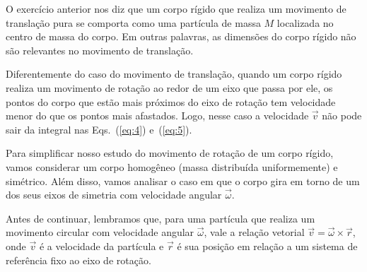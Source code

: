 \documentclass[papersize=a4,DIV=calc,twocolumn=on]{scrartcl}
\theoremstyle{definition}
\begin{document}
O exercício anterior nos diz que um corpo rígido que realiza um
movimento de translação pura se comporta como uma partícula de massa
$M$ localizada no centro de massa do corpo. Em outras palavras, as
dimensões do corpo rígido não são relevantes no movimento de
translação.

Diferentemente do caso do movimento de trans\-la\-ção, quando um corpo
rígido realiza um movimento de rotação ao redor de um eixo que passa
por ele, os pontos do corpo que estão mais próximos do eixo de rotação
tem velocidade menor do que os pontos mais afastados. Logo, nesse caso
a velocidade $\vec v$ não pode sair da integral nas Eqs.~(\ref{eq:4})
e~(\ref{eq:5}).

Para simplificar nosso estudo do movimento de rotação de um corpo
rígido, vamos considerar um corpo homogêneo (massa distribuída
uniformemente) e simétrico. Além disso, vamos analisar o caso em que o
corpo gira em torno de um dos seus eixos de simetria com velocidade
angular $\vec\omega$.

Antes de continuar, lembramos que, para uma partícula que realiza um
movimento circular com velocidade angular $\vec\omega$, vale a relação
vetorial $\vec v=\vec\omega\times\vec r$, onde $\vec v$ é a velocidade
da partícula e $\vec r$ é sua posição em relação a um sistema de
referência fixo ao eixo de rotação.
\end{document}
